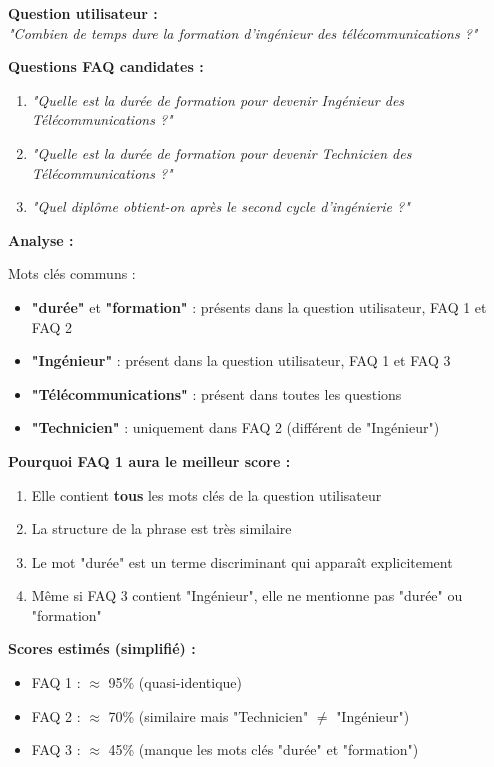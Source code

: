 \documentclass[11pt,a4paper]{article}
\begin{document}
\begin{exemple}

\textbf{Question utilisateur :} \\
\textit{"Combien de temps dure la formation d'ingénieur des télécommunications ?"}

\vspace{0.3cm}
\textbf{Questions FAQ candidates :}
\begin{enumerate}
    \item \textit{"Quelle est la durée de formation pour devenir Ingénieur des Télécommunications ?"}
    \item \textit{"Quelle est la durée de formation pour devenir Technicien des Télécommunications ?"}
    \item \textit{"Quel diplôme obtient-on après le second cycle d'ingénierie ?"}
\end{enumerate}

\vspace{0.3cm}
\textbf{Analyse :}

Mots clés communs :
\begin{itemize}
    \item \textbf{"durée"} et \textbf{"formation"} : présents dans la question utilisateur, FAQ 1 et FAQ 2
    \item \textbf{"Ingénieur"} : présent dans la question utilisateur, FAQ 1 et FAQ 3
    \item \textbf{"Télécommunications"} : présent dans toutes les questions
    \item \textbf{"Technicien"} : uniquement dans FAQ 2 (différent de "Ingénieur")
\end{itemize}

\vspace{0.3cm}
\textbf{Pourquoi FAQ 1 aura le meilleur score :}

\begin{enumerate}
    \item Elle contient \textbf{tous} les mots clés de la question utilisateur
    \item La structure de la phrase est très similaire
    \item Le mot "durée" est un terme discriminant qui apparaît explicitement
    \item Même si FAQ 3 contient "Ingénieur", elle ne mentionne pas "durée" ou "formation"
\end{enumerate}

\vspace{0.3cm}
\textbf{Scores estimés (simplifié) :}
\begin{itemize}
    \item FAQ 1 : $\approx$ 95\% (quasi-identique)
    \item FAQ 2 : $\approx$ 70\% (similaire mais "Technicien" $\neq$ "Ingénieur")
    \item FAQ 3 : $\approx$ 45\% (manque les mots clés "durée" et "formation")
\end{itemize}

\end{exemple}
\end{document}
